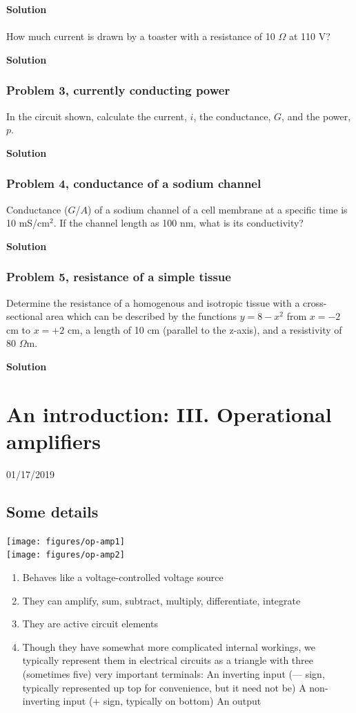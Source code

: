 \documentclass[11pt]{book}
\begin{document}
\textbf{Solution}
\\
\\
How much current is drawn by a toaster with a resistance of 10 $\Omega$ at 110 V?

\textbf{Solution}

\subsection{Problem 3, currently conducting power}
In the circuit shown, calculate the current, $i$, the conductance, $G$, and the power, $p$.

\textbf{Solution}


\subsection{Problem 4, conductance of a sodium channel}
Conductance ($G$/$A$) of a sodium channel of a cell membrane at a specific time is 10 mS/cm$^{2}$. If the channel length as 100 nm, what is its conductivity?

\textbf{Solution}


\subsection{Problem 5, resistance of a simple tissue}
Determine the resistance of a homogenous and isotropic tissue with a cross-sectional area which can be described by the functions $y = 8 - x^2$ from $x = -2$ cm to $x = +2$ cm, a length of 10 cm (parallel to the z-axis), and a resistivity of 80 $\Omega$m.

\textbf{Solution}




\chapter{An introduction: III. Operational amplifiers}
01/17/2019 
\minitoc

\section{Some details}
\texttt{[image: figures/op-amp1]}
\\
\texttt{[image: figures/op-amp2]}

\begin{enumerate}
	\item Behaves like a voltage-controlled voltage source
	\item They can amplify, sum, subtract, multiply, differentiate, integrate
	\item They are active circuit elements
	\item Though they have somewhat more complicated internal workings, we typically represent them in electrical circuits as a triangle with three (sometimes five) very important terminals:
	\subitem An inverting input (— sign, typically represented up top for convenience, but it need not be)
	\subitem A non-inverting input (+ sign, typically on bottom)
	\subitem An output
\end{enumerate}
\end{document}
